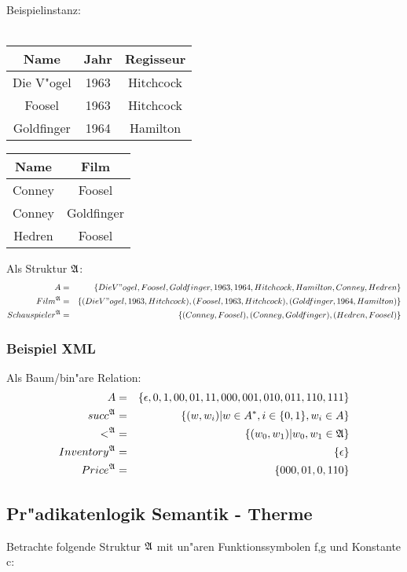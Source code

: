 Beispielinstanz: \\ \\
\begin{tabular}{|c|c|c|}
Name & Jahr & Regisseur \\
\hline
Die V"ogel & 1963 & Hitchcock \\
Foosel & 1963 & Hitchcock \\
Goldfinger & 1964 & Hamilton \\
\hline
\end{tabular} \begin{tabular}{|c|c|}
Name & Film \\
\hline
Conney & Foosel \\
Conney & Goldfinger \\
Hedren & Foosel \\
\hline
\end{tabular}

Als Struktur $\mathfrak{A}$:
\begin{eqnarray*}
A &=& \{Die V"ogel, Foosel, Goldfinger, 1963, 1964, Hitchcock, Hamilton, Conney, Hedren\}\\
Film^{\mathfrak{A}} &=& \{ (Die V"ogel, 1963, Hitchcock),
               (Foosel, 1963, Hitchcock),
               (Goldfinger, 1964, Hamilton) \} \\
Schauspieler^{\mathfrak{A}} &=& \{ (Conney, Foosel), (Conney,Goldfinger), (Hedren,Foosel)\}
\end{eqnarray*}

\subsubsection{Beispiel XML}
Als Baum/bin"are Relation:
\begin{eqnarray*}
A &=& \{\epsilon , 0, 1, 00, 01, 11, 000, 001, 010, 011, 110, 111\} \\
succ^{\mathfrak{A}} &=& \{(w, w_i) | w \in A^{*}, i \in \{0,1\}, w_i \in A \} \\
<^{\mathfrak{A}} &=& \{ (w_0, w_1) | w_0,w_1 \in \mathfrak{A}\} \\
Inventory^{\mathfrak{A}} &=& \{ \epsilon \} \\
Price^{\mathfrak{A}} &=& \{ 000, 01,0, 110 \}
\end{eqnarray*}

\subsection{Pr"adikatenlogik Semantik - Therme}
Betrachte folgende Struktur $\mathfrak{A}$ mit un"aren Funktionssymbolen f,g und Konstante c:

